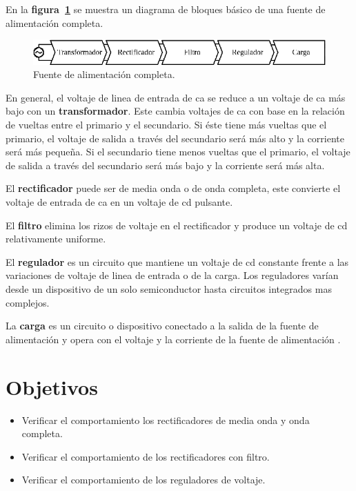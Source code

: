 \documentclass[letter,twoside,11pt]{article}
\begin{document}
En la \textbf{figura~\ref{diagrama}} se muestra un diagrama de bloques básico de
una fuente de alimentación completa.

\begin{figure}[!h]
\centering
\includegraphics[scale=1.50]{00.diagrama.eps}
\caption{Fuente de alimentación completa.}
\label{diagrama}
\end{figure}

En general, el voltaje de linea de entrada de ca se reduce a un voltaje de ca
más bajo con un \textbf{transformador}. Este cambia voltajes de ca con base en
la relación de vueltas entre el primario y el secundario. Si éste tiene más
vueltas que el primario, el voltaje de salida a través del secundario será más
alto y la corriente será más pequeña. Si el secundario tiene menos vueltas que
el primario, el voltaje de salida a través del secundario será más bajo y la
corriente será más alta.

El \textbf{rectificador} puede ser de media onda o de onda completa, este
convierte el voltaje de entrada de ca en un voltaje de cd pulsante.

El \textbf{filtro} elimina los rizos de voltaje en el rectificador y produce un
voltaje de cd relativamente uniforme.

El \textbf{regulador} es un circuito que mantiene un voltaje de cd constante
frente a las variaciones de voltaje de linea de entrada o de la carga. Los
reguladores varían desde un dispositivo de un solo semiconductor hasta circuitos
integrados mas complejos.

La \textbf{carga} es un circuito o dispositivo conectado a la salida de la
fuente de alimentación y opera con el voltaje y la corriente de la fuente de
alimentación \cite{Floyd}.

\section{Objetivos}
\begin{itemize}
    \item Verificar el comportamiento los rectificadores de media onda y onda
        completa.
    \item Verificar el comportamiento de los rectificadores con filtro.
    \item Verificar el comportamiento de los reguladores de voltaje.
\end{itemize}
\end{document}
